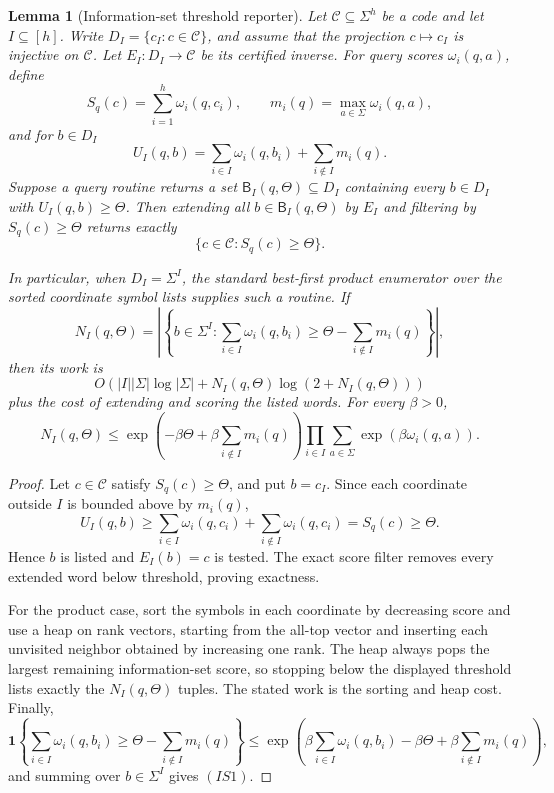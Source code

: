\documentclass[10pt]{article}
\newtheorem{lemma}[theorem]{Lemma}
\theoremstyle{definition}
\begin{document}
\begin{lemma}[Information-set threshold reporter]
   \label{lem:information-set-threshold-reporter}
   Let \(\mathcal C\subseteq\Sigma^h\) be a code and let
   \(I\subseteq[h]\).  Write
   \(D_I=\{c_I:c\in\mathcal C\}\), and assume that the projection
   \(c\mapsto c_I\) is injective on \(\mathcal C\).  Let
   \(E_I:D_I\to\mathcal C\) be its certified inverse.  For query scores
   \(\omega_i(q,a)\), define
   \[
      S_q(c)=\sum_{i=1}^h\omega_i(q,c_i),
      \qquad
      m_i(q)=\max_{a\in\Sigma}\omega_i(q,a),
   \]
   and for \(b\in D_I\)
   \[
      U_I(q,b)
      =
      \sum_{i\in I}\omega_i(q,b_i)
      +
      \sum_{i\notin I}m_i(q).
   \]
   Suppose a query routine returns a set \(\mathsf B_I(q,\Theta)\subseteq D_I\)
   containing every \(b\in D_I\) with \(U_I(q,b)\ge\Theta\).  Then extending
   all \(b\in\mathsf B_I(q,\Theta)\) by \(E_I\) and filtering by
   \(S_q(c)\ge\Theta\) returns exactly
   \[
      \{c\in\mathcal C:S_q(c)\ge\Theta\}.
   \]

   In particular, when \(D_I=\Sigma^I\), the standard best-first product
   enumerator over the sorted coordinate symbol lists supplies such a routine.
   If
   \[
      N_I(q,\Theta)=
      \left|
      \left\{
      b\in\Sigma^I:
      \sum_{i\in I}\omega_i(q,b_i)
      \ge
      \Theta-\sum_{i\notin I}m_i(q)
      \right\}
      \right|,
   \]
   then its work is
   \[
      O\!\left(
      |I||\Sigma|\log|\Sigma|
      +
      N_I(q,\Theta)\log(2+N_I(q,\Theta))
      \right)
   \]
   plus the cost of extending and scoring the listed words.  For every
   \(\beta>0\),
   \[
      N_I(q,\Theta)
      \le
      \exp\!\left(
         -\beta\Theta
         +
         \beta\sum_{i\notin I}m_i(q)
      \right)
      \prod_{i\in I}
      \sum_{a\in\Sigma}\exp(\beta\omega_i(q,a)).
      \tag{IS1}
   \]
\end{lemma}

\begin{proof}
   Let \(c\in\mathcal C\) satisfy \(S_q(c)\ge\Theta\), and put
   \(b=c_I\).  Since each coordinate outside \(I\) is bounded above by
   \(m_i(q)\),
   \[
      U_I(q,b)
      \ge
      \sum_{i\in I}\omega_i(q,c_i)
      +
      \sum_{i\notin I}\omega_i(q,c_i)
      =
      S_q(c)
      \ge\Theta .
   \]
   Hence \(b\) is listed and \(E_I(b)=c\) is tested.  The exact score filter
   removes every extended word below threshold, proving exactness.

   For the product case, sort the symbols in each coordinate by decreasing
   score and use a heap on rank vectors, starting from the all-top vector and
   inserting each unvisited neighbor obtained by increasing one rank.  The heap
   always pops the largest remaining information-set score, so stopping below
   the displayed threshold lists exactly the \(N_I(q,\Theta)\) tuples.  The
   stated work is the sorting and heap cost.  Finally,
   \[
      \mathbf 1\left\{
      \sum_{i\in I}\omega_i(q,b_i)
      \ge
      \Theta-\sum_{i\notin I}m_i(q)
      \right\}
      \le
      \exp\!\left(
         \beta\sum_{i\in I}\omega_i(q,b_i)
         -
         \beta\Theta
         +
         \beta\sum_{i\notin I}m_i(q)
      \right),
   \]
   and summing over \(b\in\Sigma^I\) gives \((IS1)\).
\end{proof}
\end{document}
